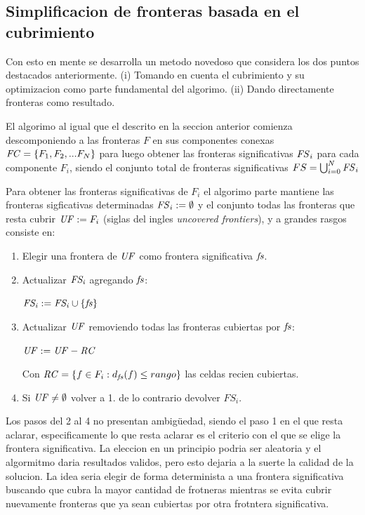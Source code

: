 \subsection{Simplificacion de fronteras basada en el cubrimiento}
Con esto en mente se desarrolla un metodo novedoso que considera los dos puntos
destacados anteriormente. (i) Tomando en cuenta el cubrimiento y su
optimizacion como parte fundamental del algorimo. (ii) Dando directamente
fronteras como resultado.

El algorimo al igual que el descrito en la seccion anterior comienza
descomponiendo a las fronteras $F$ en sus componentes conexas
$\mathit{FC}=\{F_1,F_2,...F_N\}$ para luego obtener las fronteras significativas
$\mathit{FS}_i$ para cada componente $F_i$, siendo el conjunto total de fronteras
significativas $FS = \bigcup^N_{i=0} \mathit{FS}_i$

Para obtener las fronteras significativas de $F_i$ el algorimo parte mantiene
las fronteras sigficativas determinadas $\mathit{FS}_i := \emptyset$ y el conjunto
todas las fronteras que resta cubrir $\mathit{UF} := F_i$ (siglas del ingles
\emph{uncovered frontiers}), y a grandes rasgos consiste en:
\begin{enumerate}
  \item Elegir una frontera de $\mathit{UF}$ como frontera significativa $\mathit{fs}$.

  \item Actualizar $\mathit{FS_i}$ agregando $\mathit{fs}$:

    $\mathit{FS_i} := \mathit{FS_i} \cup \{\mathit{fs}\}$

  \item Actualizar $\mathit{UF}$ removiendo todas las fronteras cubiertas por $\mathit{fs}$:

    $\mathit{UF} := \mathit{UF} - \mathit{RC}$

    Con $\mathit{RC}=\{ f\in F_i : d_{\mathit{fs}}(f) \leq rango\}$ las celdas recien
    cubiertas.

  \item Si $\mathit{UF} \neq \emptyset$ volver a 1. de lo contrario devolver $FS_i$.
\end{enumerate}


Los pasos del 2 al 4 no presentan ambigüedad, siendo el paso 1 en el que resta
aclarar, especificamente lo que resta aclarar es el criterio con el que se
elige la frontera significativa. La eleccion en un principio podria ser
aleatoria y el algormitmo daria resultados validos, pero esto dejaria a la
suerte la calidad de la solucion. La idea seria elegir de forma determinista a
una frontera significativa buscando que cubra la mayor cantidad de frotneras
mientras se evita cubrir nuevamente fronteras que ya sean cubiertas por otra
frotntera significativa. 

